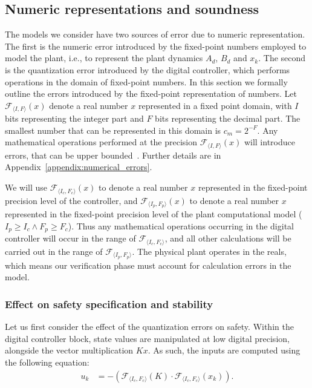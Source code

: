 \documentclass[runningheads,a4paper]{llncs}
\begin{document}
\subsection{Numeric representations and soundness} 
\label{sec:numeric_rep}


The models we consider have two sources of error due to numeric representation. 
The first is the numeric error introduced by the fixed-point numbers employed to model the plant, i.e., to represent the plant dynamics $A_d$, $B_d$ and $x_k$. 
The second is the quantization error introduced by the digital controller, 
which performs operations in the domain of fixed-point numbers. 
In this section we formally outline the errors introduced by the fixed-point representation of numbers. 
% 
Let $\mathcal{F}_{\langle I,F \rangle}(x)$ denote a real number $x$ represented in a fixed point domain, with $I$ bits representing the integer part and $F$ bits representing the decimal part. The smallest number that can be represented in this domain is $c_m=2^{-F}$. Any mathematical operations performed at the precision $\mathcal{F}_{\langle I,F \rangle}(x)$ will introduce errors, that can be upper bounded~\cite{DBLP:conf/arith/BrainTRW15}. Further details are in Appendix~\ref{appendix:numerical_errors}.

We will use $\mathcal{F}_{\langle I_c,F_c \rangle}(x)$ to denote a real number $x$ represented in the fixed-point precision level of the controller, and $\mathcal{F}_{\langle I_p,F_p \rangle}(x)$ to denote a real number $x$ represented in the fixed-point precision level of the plant computational model ($I_p \geq I_c \wedge F_p \geq F_c$).
Thus any mathematical operations occurring in the digital controller will occur in the range of $\mathcal{F}_{\langle I_c,F_c \rangle}$, and all other calculations will be carried out in the range of $\mathcal{F}_{\langle I_p,F_p \rangle}$. The physical plant operates in the reals, which means our verification phase must account for calculation errors in the model.

\subsubsection{Effect on safety specification and stability}

Let us first consider the effect of the quantization errors on safety. 
Within the digital controller block, 
state values are manipulated at low digital precision, 
alongside the vector multiplication $Kx$.   
As such, the inputs are computed using the following equation: 
\begin{align*}
u_{k}&=-(\mathcal{F}_{\langle I_c,F_c \rangle}(K)\cdot\mathcal{F}_{\langle I_c,F_c \rangle}(x_{k})). 
\end{align*}
\end{document}
